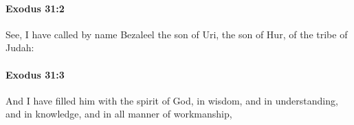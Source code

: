 		\paragraph{Exodus 31:2} %
			\label{EXODUS-31-2}

			See, I have called by name Bezaleel the son of Uri, the son of Hur, of the tribe of Judah:


		\paragraph{Exodus 31:3} %
			\label{EXODUS-31-3}

			And I have filled him with the spirit of God, in wisdom, and in understanding, and in knowledge, and in all manner of workmanship,


